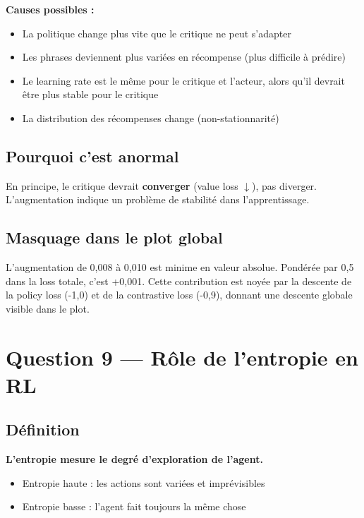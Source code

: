 \documentclass[11pt,a4paper]{article}
\begin{document}
\textbf{Causes possibles :}
\begin{itemize}
    \item La politique change plus vite que le critique ne peut s'adapter
    \item Les phrases deviennent plus variées en récompense (plus difficile à prédire)
    \item Le learning rate est le même pour le critique et l'acteur, alors qu'il devrait être plus stable pour le critique
    \item La distribution des récompenses change (non-stationnarité)
\end{itemize}

\subsection{Pourquoi c'est anormal}

En principe, le critique devrait \textbf{converger} (value loss $\downarrow$), pas diverger. L'augmentation indique un problème de stabilité dans l'apprentissage.

\subsection{Masquage dans le plot global}

L'augmentation de 0{,}008 à 0{,}010 est minime en valeur absolue. Pondérée par 0{,}5 dans la loss totale, c'est +0{,}001. Cette contribution est noyée par la descente de la policy loss (-1{,}0) et de la contrastive loss (-0{,}9), donnant une descente globale visible dans le plot.

\section{Question 9 — Rôle de l'entropie en RL}

\subsection{Définition}

\textbf{L'entropie mesure le degré d'exploration de l'agent.}

\begin{itemize}
    \item Entropie haute : les actions sont variées et imprévisibles
    \item Entropie basse : l'agent fait toujours la même chose
\end{itemize}
\end{document}
